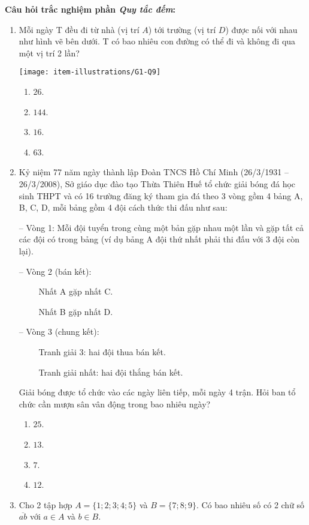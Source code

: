\noindent\textbf{Câu hỏi trắc nghiệm phần \textit{Quy tắc đếm}:}
\begin{enumerate}[label=\textbf{Câu \arabic*.},align=left,left=0cm..0cm,itemindent=*]
	\item Mỗi ngày T đều đi từ nhà (vị trí $A$) tới trường (vị trí $D$) được nối với nhau như hình vẽ bên dưới. T có bao nhiêu con đường có thể đi và không đi qua một vị trí 2 lần?\par {\centering\texttt{[image: item-illustrations/G1-Q9]}\par}
	\begin{enumerate}[label=\textbf{\Alph*.},align=left,left=1cm..0cm,itemindent=*]
		\item $26$. \item $144$. \item $16$. \item $63$.
	\end{enumerate}
	\item Kỷ niệm 77 năm ngày thành lập Đoàn TNCS Hồ Chí Minh (26/3/1931 – 26/3/2008), Sở giáo dục đào tạo Thừa Thiên Huế tổ chức giải bóng đá học sinh THPT và có 16 trường đăng ký tham gia đá theo 3 vòng gồm 4 bảng A, B, C, D, mỗi bảng gồm 4 đội cách thức thi đấu như sau:\par
	– Vòng 1: Mỗi đội tuyển trong cùng một bản gặp nhau một lần và gặp tất cả các đội có trong bảng (ví dụ bảng A đội thứ nhất phải thi đấu với 3 đội còn lại).\par
	– Vòng 2 (bán kết):\par
	~~~~ Nhất A gặp nhất C.\par
	~~~~ Nhất B gặp nhất D.\par
	– Vòng 3 (chung kết):\par
	~~~~ Tranh giải 3: hai đội thua bán kết.\par
	~~~~ Tranh giải nhất: hai đội thắng bán kết.\par
	Giải bóng được tổ chức vào các ngày liên tiếp, mỗi ngày 4 trận. Hỏi ban tổ chức cần mượn sân vân động trong bao nhiêu ngày?
	\begin{enumerate}[label=\textbf{\Alph*.},align=left,left=1cm..0cm,itemindent=*]
		\item $25$. \item $13$. \item $7$. \item $12$.
	\end{enumerate}
	\item Cho 2 tập hợp $A=\{1;2;3;4;5\}$ và $B=\{7;8;9\}$. Có bao nhiêu số có 2 chữ số $\overline{ab}$ với $a\in A$ và $b\in B$.

\end{enumerate}
